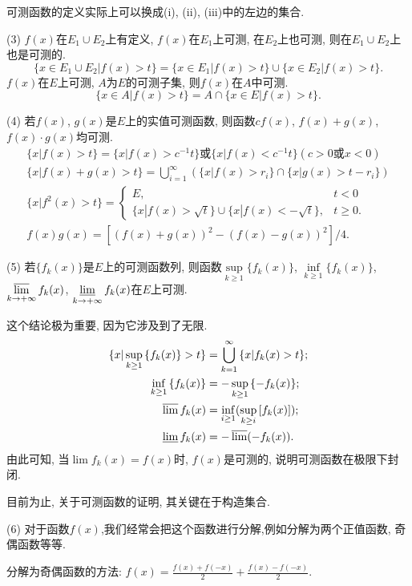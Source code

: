 \documentclass[12pt,a4paper,openany]{book}
\begin{document}
可测函数的定义实际上可以换成(i), (ii), (iii)中的左边的集合.

(3) $f(x)$在$E_1 \cup E_2$上有定义, $f(x)$在$E_1$上可测, 在$E_2$上也可测, 则在$E_1 \cup E_2$上也是可测的.
\[
\{x \in E_1 \cup E_2 | f(x) > t\} = \{x \in E_1 | f(x) > t\} \cup \{x \in E_2 | f(x) > t\}.
\]
$f(x)$在$E$上可测, $A$为$E$的可测子集, 则$f(x)$在$A$中可测.
\[
\{x \in A | f(x) > t\} = A \cap \{x \in E | f(x) > t\}.
\]

(4) 若$f(x)$, $g(x)$是$E$上的实值可测函数, 则函数$cf(x)$, $f(x) + g(x)$, $f(x) \cdot g(x)$均可测.
\begin{gather*}
\{x | f(x) > t\} = \{x | f(x) > c^{-1}t\} \text{或}\{x | f(x) < c^{-1}t\} (c > 0 \text{或} x < 0) \\
\{x | f(x) + g(x) > t\} = \bigcup_{i=1}^{\infty}{(\{x | f(x) > r_i\} \cap \{x | g(x) > t - r_i\})} \\
\{x | f^2(x) > t\} = 
\begin{cases}
E, &t < 0 \\
\{x | f(x) > \sqrt{t}\} \cup \{x | f(x) < -\sqrt{t}\}, &t \ge 0.
\end{cases} \\
f(x)g(x) = [(f(x) + g(x))^2 - (f(x) - g(x))^2] / 4.
\end{gather*}

(5) 若$\{f_k(x)\}$是$E$上的可测函数列, 则函数$\sup\limits_{k \ge 1}{\{f_k(x)\}}$, $\inf\limits_{k \ge 1}{\{f_k(x)\}}$, $\varlimsup\limits_{k \rightarrow +\infty}{f_k(x)}$, $\varliminf\limits_{k \rightarrow +\infty}{f_k(x)}$在$E$上可测.

这个结论极为重要, 因为它涉及到了无限.
\[
\begin{aligned}
\{ x | \sup_{k \ge 1}{\{f_k(x)\}} > t\} &= \bigcup_{k=1}^{\infty}{\{x | f_k(x) > t\}};\\
\inf_{k \ge 1}{\{f_k(x)\}} &= -\sup_{k \ge 1}{\{-f_k(x)\}}; \\
\varlimsup{f_k(x)} &= \inf_{i \ge 1}(\sup_{k \ge i}{[f_k(x)]}); \\
\varliminf{f_k(x)} &= -\varlimsup(-f_k(x)).
\end{aligned}
\]
由此可知, 当$\lim{f_k(x)} = f(x)$时, $f(x)$是可测的, 说明可测函数在极限下封闭.

目前为止, 关于可测函数的证明, 其关键在于构造集合.

(6) 对于函数$f(x)$,我们经常会把这个函数进行分解,例如分解为两个正值函数, 奇偶函数等等.

分解为奇偶函数的方法: $f(x) = \frac{f(x) + f(-x)}{2} + \frac{f(x) - f(-x)}{2}$.
\end{document}

